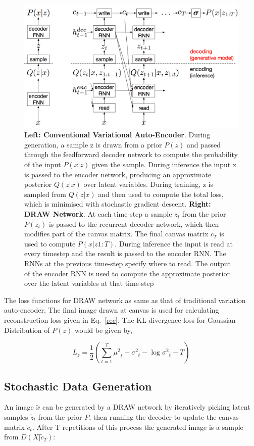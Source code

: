 \documentclass{scrartcl}
\begin{document}
\begin{figure}
\centering
  \includegraphics[width=350pt]{networkarch.png}
  \caption{\textbf{Left: Conventional Variational Auto-Encoder}. During generation, a sample z is drawn from a prior $P(z)$ and passed
through the feedforward decoder network to compute the probability of the input $P(x|z)$ given the sample. During inference the
input x is passed to the encoder network, producing an approximate posterior $Q(z|x)$ over latent variables. During training, z
is sampled from $Q(z|x)$ and then used to compute the total loss, which is minimised with stochastic gradient descent.
 \textbf{Right: DRAW Network}. At each time-step a sample $z_t$ from the prior $P(z_t)$ is passed to the recurrent decoder network, which then modifies part of the canvas matrix. The final canvas matrix $c_T$ is used to compute $P(x|z1:T)$. During inference the input is read at every timestep and the result is passed to the encoder RNN. The RNNs at the previous time-step specify where to read. The output of the encoder RNN is used to compute the approximate posterior over the latent variables at that time-step
  }
\label{network_arch}
\end{figure}

The loss functions for DRAW network as same as that of traditional variation auto-encoder.
The final image drawn at canvas is used for calculating reconstruction loss given in Eq.~\ref{rec}.
The KL divergence loss for Gaussian Distribution of $P(z)$ would be given by,

\begin{equation}\label{klg}
  L_{z} = \frac{1}{2} ( \sum^{T}_{t=1} {\mu^2}_t + {\sigma^2}_t - \log {\sigma^2}_t - T )
\end{equation}


\subsection{Stochastic Data Generation}
An image $\tilde{x}$ can be generated by a DRAW network by iteratively picking latent samples $\tilde{z}_t$ from the prior $P$, then running the decoder to update the canvas matrix $\tilde{c}_t$.
After T repetitions of this process the generated image is a sample from $D(X|\tilde{c}_T )$:
\end{document}
